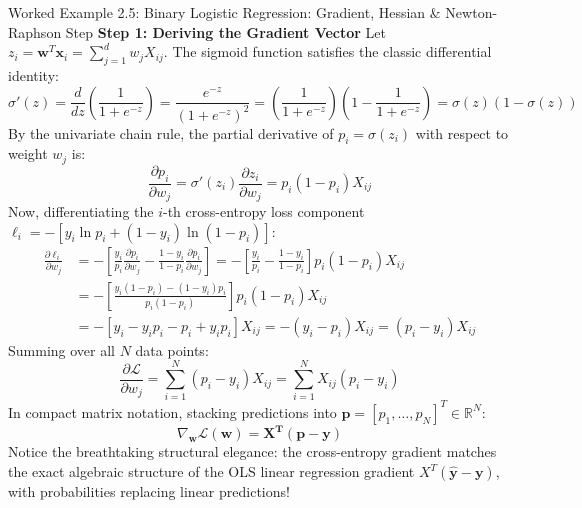 \begin{examplebox}[breakable]{Worked Example 2.5: Binary Logistic Regression: Gradient, Hessian \& Newton-Raphson Step}
\textbf{Step 1: Deriving the Gradient Vector}
Let $z_i = \mathbf{w}^T \mathbf{x}_i = \sum_{j=1}^d w_j X_{ij}$. The sigmoid function satisfies the classic differential identity:
\begin{equation*}
\sigma'(z) = \frac{d}{dz}\left( \frac{1}{1 + e^{-z}} \right) = \frac{e^{-z}}{(1 + e^{-z})^2} = \left(\frac{1}{1 + e^{-z}}\right)\left(1 - \frac{1}{1 + e^{-z}}\right) = \sigma(z)(1 - \sigma(z))
\end{equation*}
By the univariate chain rule, the partial derivative of $p_i = \sigma(z_i)$ with respect to weight $w_j$ is:
\begin{equation*}
\frac{\partial p_i}{\partial w_j} = \sigma'(z_i) \frac{\partial z_i}{\partial w_j} = p_i(1 - p_i) X_{ij}
\end{equation*}
Now, differentiating the $i$-th cross-entropy loss component $\ell_i = -[y_i \ln p_i + (1 - y_i) \ln(1 - p_i)]$:
\begin{align*}
\frac{\partial \ell_i}{\partial w_j} &= -\left[ \frac{y_i}{p_i} \frac{\partial p_i}{\partial w_j} - \frac{1 - y_i}{1 - p_i} \frac{\partial p_i}{\partial w_j} \right] = -\left[ \frac{y_i}{p_i} - \frac{1 - y_i}{1 - p_i} \right] p_i(1 - p_i) X_{ij} \\
&= -\left[ \frac{y_i(1 - p_i) - (1 - y_i)p_i}{p_i(1 - p_i)} \right] p_i(1 - p_i) X_{ij} \\
&= -[y_i - y_i p_i - p_i + y_i p_i] X_{ij} = -(y_i - p_i) X_{ij} = (p_i - y_i) X_{ij}
\end{align*}
Summing over all $N$ data points:
\begin{equation*}
\frac{\partial \mathcal{L}}{\partial w_j} = \sum_{i=1}^N (p_i - y_i) X_{ij} = \sum_{i=1}^N X_{ij} (p_i - y_i)
\end{equation*}
In compact matrix notation, stacking predictions into $\mathbf{p} = [p_1, \dots, p_N]^T \in \mathbb{R}^N$:
\begin{equation*}
\nabla_{\mathbf{w}} \mathcal{L}(\mathbf{w}) = \mathbf{X^T (\mathbf{p} - \mathbf{y})}
\end{equation*}
Notice the breathtaking structural elegance: the cross-entropy gradient matches the exact algebraic structure of the OLS linear regression gradient $X^T(\hat{\mathbf{y}} - \mathbf{y})$, with probabilities replacing linear predictions!


\end{examplebox}
